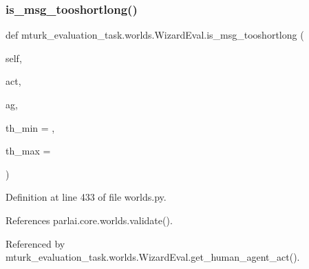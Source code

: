 \subsubsection{\texorpdfstring{is\+\_\+msg\+\_\+tooshortlong()}{is\_msg\_tooshortlong()}}
{\footnotesize\ttfamily def mturk\+\_\+evaluation\+\_\+task.\+worlds.\+Wizard\+Eval.\+is\+\_\+msg\+\_\+tooshortlong (\begin{DoxyParamCaption}\item[{}]{self,  }\item[{}]{act,  }\item[{}]{ag,  }\item[{}]{th\+\_\+min = {},  }\item[{}]{th\+\_\+max = {} }\end{DoxyParamCaption})}



Definition at line 433 of file worlds.\+py.



References parlai.\+core.\+worlds.\+validate().



Referenced by mturk\+\_\+evaluation\+\_\+task.\+worlds.\+Wizard\+Eval.\+get\+\_\+human\+\_\+agent\+\_\+act().

